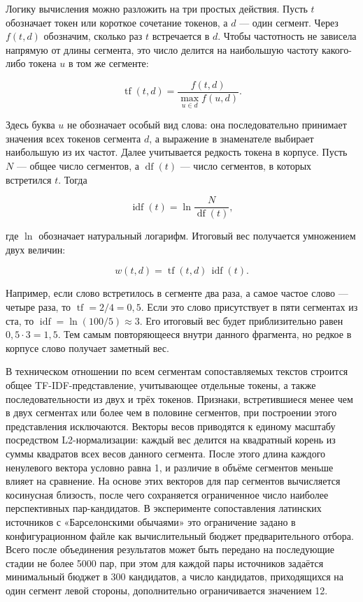 Логику вычисления можно разложить на три простых действия. Пусть $t$ обозначает токен или короткое сочетание токенов, а $d$ --- один сегмент. Через $f(t,d)$ обозначим, сколько раз $t$ встречается в $d$. Чтобы частотность не зависела напрямую от длины сегмента, это число делится на наибольшую частоту какого-либо токена $u$ в том же сегменте:

\begin{equation}
\operatorname{tf}(t,d)=\frac{f(t,d)}{\max\limits_{u\in d} f(u,d)}.
\end{equation}

Здесь буква $u$ не обозначает особый вид слова: она последовательно принимает значения всех токенов сегмента $d$, а выражение в знаменателе выбирает наибольшую из их частот. Далее учитывается редкость токена в корпусе. Пусть $N$ --- общее число сегментов, а $\operatorname{df}(t)$ --- число сегментов, в которых встретился $t$. Тогда

\begin{equation}
\operatorname{idf}(t)=\ln\frac{N}{\operatorname{df}(t)},
\end{equation}

где $\ln$ обозначает натуральный логарифм. Итоговый вес получается умножением двух величин:

\begin{equation}
w(t,d)=\operatorname{tf}(t,d)\,\operatorname{idf}(t).
\end{equation}

Например, если слово встретилось в сегменте два раза, а самое частое слово --- четыре раза, то $\operatorname{tf}=2/4=0{,}5$. Если это слово присутствует в пяти сегментах из ста, то $\operatorname{idf}=\ln(100/5)\approx3$. Его итоговый вес будет приблизительно равен $0{,}5\cdot3=1{,}5$. Тем самым повторяющееся внутри данного фрагмента, но редкое в корпусе слово получает заметный вес.

В техническом отношении по всем сегментам сопоставляемых текстов строится общее TF-IDF-представление, учитывающее отдельные токены, а также последовательности из двух и трёх токенов. Признаки, встретившиеся менее чем в двух сегментах или более чем в половине сегментов, при построении этого представления исключаются. Векторы весов приводятся к единому масштабу посредством L2-нормализации: каждый вес делится на квадратный корень из суммы квадратов всех весов данного сегмента. После этого длина каждого ненулевого вектора условно равна 1, и различие в объёме сегментов меньше влияет на сравнение. На основе этих векторов для пар сегментов вычисляется косинусная близость, после чего сохраняется ограниченное число наиболее перспективных пар-кандидатов. В эксперименте сопоставления латинских источников с «Барселонскими обычаями» это ограничение задано в конфигурационном файле как вычислительный бюджет предварительного отбора. Всего после объединения результатов может быть передано на последующие стадии не более 5000 пар, при этом для каждой пары источников задаётся минимальный бюджет в 300 кандидатов, а число кандидатов, приходящихся на один сегмент левой стороны, дополнительно ограничивается значением 12.

